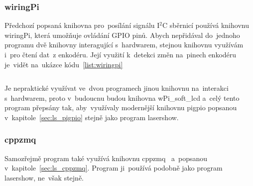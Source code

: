 \subsubsection{wiringPi}
Předchozí popsaná knihovna pro~posílání signálu I$^{2}$C sběrnicí používá knihovnu wiringPi, která umožňuje ovládání GPIO pinů. Abych nepřidával do~jednoho programu dvě knihovny interagující s~hardwarem, stejnou knihovnu využívám i~pro čtení dat~z enkodéru. Její využití k~detekci změn na~pinech enkodéru je~vidět na~ukázce kódu~\ref{list:wiringpi}

\begin{code}
    \inputminted[frame=lines,fontsize=\footnotesize{}, linenos, breaklines]{cpp}{code_examples/wiringpi_isr.cpp}
\end{code}

Je nepraktické využívat ve~dvou programech jinou knihovnu na~interakci s~hardwarem, proto v~budoucnu budou knihovna wPi\_soft\_lcd a~celý tento program přepsány tak, aby~využívaly modernější knihovnu pigpio popsanou v~kapitole~\ref{sec:ls_pigpio} stejně jako program lasershow.


\subsubsection{cppzmq}
Samozřejmě program také využívá knihovnu cppzmq~\cite{cppzmq} a~popsanou v~kapitole~\ref{sec:ls_cppzmq}. Program ji~používá podobně jako program lasershow, ne~však stejně.

